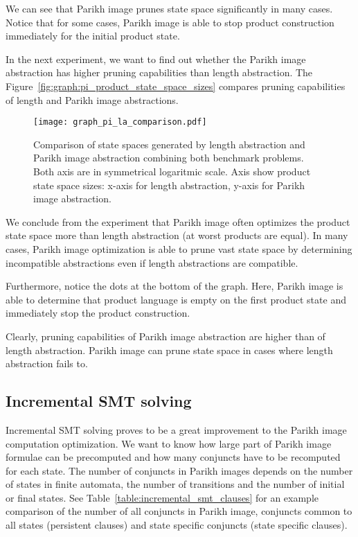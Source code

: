 We can see that Parikh image prunes state space significantly in many cases. Notice that for some cases, Parikh image is able to stop product construction immediately for the initial product state.

In the next experiment, we want to find out whether the Parikh image abstraction has higher pruning capabilities than length abstraction. The Figure~\ref{fig:graph:pi_product_state_space_sizes} compares pruning capabilities of length and Parikh image abstractions.

\begin{figure}[ht]
	\centering
	\texttt{[image: graph\_pi\_la\_comparison.pdf]}
	\caption{Comparison of state spaces generated by length abstraction and Parikh image abstraction combining both benchmark problems. Both axis are in symmetrical logaritmic scale. Axis show product state space sizes: x-axis for length abstraction, y-axis for Parikh image abstraction.}
	\label{fig:diagram:pi_la_comparison}
\end{figure}

We conclude from the experiment that Parikh image often optimizes the product state space more than length abstraction (at worst products are equal). In many cases, Parikh image optimization is able to prune vast state space by determining incompatible abstractions even if length abstractions are compatible.

Furthermore, notice the dots at the bottom of the graph. Here, Parikh image is able to determine that product language is empty  on the first product state and immediately stop the product construction.

Clearly, pruning capabilities of Parikh image abstraction are higher than of length abstraction. Parikh image can prune state space in cases where length abstraction fails to.

\subsection{Incremental SMT solving}

Incremental SMT solving proves to be a great improvement to the Parikh image computation optimization. We want to know how large part of Parikh image formulae can be precomputed and how many conjuncts have to be recomputed for each state. The number of conjuncts in Parikh images depends on the number of states in finite automata, the number of transitions and the number of initial or final states. See Table~\ref{table:incremental_smt_clauses} for an example comparison of the number of all conjuncts in Parikh image, conjuncts common to all states (persistent clauses) and state specific conjuncts (state specific clauses).

